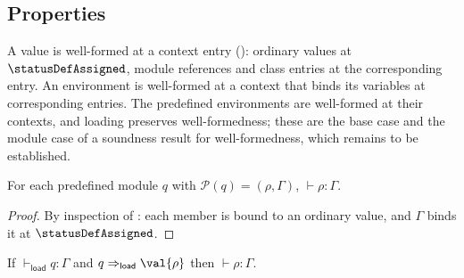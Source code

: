 \subsection{Properties}
\label{sec:properties}

A value is well-formed at a context entry (): ordinary values at
$\statusDefAssigned$, module references and class entries at the corresponding entry. An environment is
well-formed at a context that binds its variables at corresponding entries. The predefined environments
are well-formed at their contexts, and loading preserves well-formedness; these are the base case and the
module case of a soundness result for well-formedness, which remains to be established.

\begin{lemma}
\label{lem:predefined}
For each predefined module $q$ with $\mathcal{P}(q) = (\rho, \Gamma)$, $\vdash \rho : \Gamma$.
\end{lemma}
\begin{proof}
By inspection of : each member is bound to an ordinary value, and $\Gamma$ binds it at
$\statusDefAssigned$.
\end{proof}

\begin{theorem}
\label{thm:load-preservation}
If $\vdash_{\mathsf{load}} q : \Gamma$ and $q \Rightarrow_{\mathsf{load}} \val{\rho}$ then $\vdash \rho : \Gamma$.
\end{theorem}


